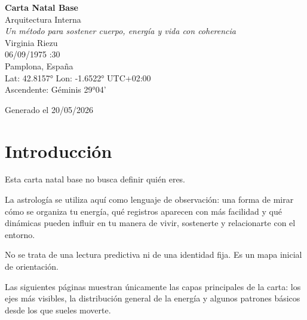 \documentclass[11pt,a4paper]{article}
\begin{document}

\begin{titlepage}

\centering

\vspace*{1.5cm}

{\Huge\bfseries\color{azulai} Carta Natal Base}\\[0.5cm]

{\large\color{grisai} Arquitectura Interna}\\[0.4cm]

{\small\itshape\color{grisai}
Un método para sostener cuerpo, energía y vida con coherencia
}\\[2cm]

{\huge\color{doradoai} Virginia Riezu}\\[1.5cm]

{\Large 06/09/1975 :30}\\[0.3cm]

{\Large Pamplona, España}\\[0.3cm]

{\normalsize
Lat: 42.8157° \quad
Lon: -1.6522° \quad
UTC+02:00
}\\[0.5cm]

{\normalsize
Ascendente: Géminis 29°04'
}\\[2.5cm]

\vfill

{\small Generado el 20/05/2026}

\end{titlepage}



\section*{Introducción}

Esta carta natal base no busca definir quién eres.

La astrología se utiliza aquí como lenguaje de observación:
una forma de mirar cómo se organiza tu energía,
qué registros aparecen con más facilidad
y qué dinámicas pueden influir en tu manera de vivir, sostenerte y relacionarte con el entorno.

No se trata de una lectura predictiva ni de una identidad fija.
Es un mapa inicial de orientación.

Las siguientes páginas muestran únicamente las capas principales de la carta:
los ejes más visibles,
la distribución general de la energía
y algunos patrones básicos desde los que sueles moverte.
\end{document}
